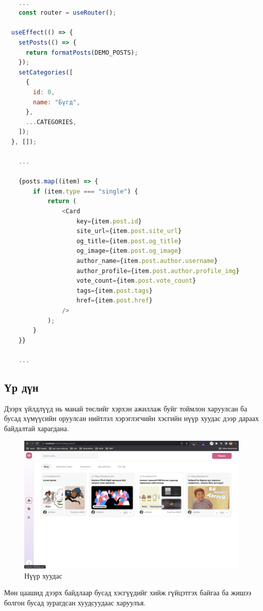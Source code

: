 \begin{lstlisting}[language=Javascript, caption=Card компонентод props-р утга дамжуулах, frame=single]
	
	...
	const router = useRouter();

  useEffect(() => {
    setPosts(() => {
      return formatPosts(DEMO_POSTS);
    });
    setCategories([
      {
        id: 0,
        name: "Бүгд",
      },
      ...CATEGORIES,
    ]);
  }, []);

	... 

	{posts.map((item) => {
		if (item.type === "single") {
			return (
				<Card
					key={item.post.id}
					site_url={item.post.site_url}
					og_title={item.post.og_title}
					og_image={item.post.og_image}
					author_name={item.post.author.username}
					author_profile={item.post.author.profile_img}
					vote_count={item.post.vote_count}
					tags={item.post.tags}
					href={item.post.href}
				/>
			);
		}
	}}

	...

\end{lstlisting}

\subsection{Үр дүн}

Дээрх үйлдлүүд нь манай төслийг хэрхэн ажиллаж буйг тоймлон харуулсан ба бусад хүмүүсийн оруулсан нийтлэл хэрэглэгчийн хэсгийн нүүр хуудас дээр дараах байдалтай харагдана. 

\begin{figure}[h]
	\centering
	\includegraphics[width=13cm]{images/implement/home-page.png}
	\caption{Нүүр хуудас}
	\label{fig:home-page}
\end{figure}

Мөн цаашид дээрх байдлаар бусад хэсгүүдийг хийж гүйцэтгэх байгаа ба жишээ болгон бусад зурагдсан хуудсуудаас харуулъя.


